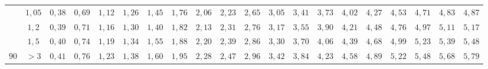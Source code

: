 \begin{table}[]
{\begin{tabular}{|c|c|c|c|c|c|c|c|c|c|c|c|c|c|c|c|c|c|c|c|}
                        & $1,05$                                                                              & \cellcolor[HTML]{FFCCC9}$0,38$ & \cellcolor[HTML]{FFCCC9}$0,69$ & \cellcolor[HTML]{FFCCC9}$1,12$ & \cellcolor[HTML]{FFCCC9}$1,26$ & \cellcolor[HTML]{FFCCC9}$1,45$ & \cellcolor[HTML]{FD6864}$1,76$ & \cellcolor[HTML]{FD6864}$2,06$ & \cellcolor[HTML]{FD6864}$2,23$ & \cellcolor[HTML]{FD6864}$2,65$ & \cellcolor[HTML]{FE0000}$3,05$ & \cellcolor[HTML]{FE0000}$3,41$ & \cellcolor[HTML]{CB0000}$3,73$ & \cellcolor[HTML]{CB0000}$4,02$                        & \cellcolor[HTML]{CB0000}$4,27$ & \cellcolor[HTML]{9A0000}$4,53$ & \cellcolor[HTML]{9A0000}$4,71$ & \cellcolor[HTML]{F8A102}$4,83$ & \cellcolor[HTML]{F8A102}$4,87$ \\ \cline{2-20} 
                        & $1,2$                                                                               & \cellcolor[HTML]{FFCCC9}$0,39$ & \cellcolor[HTML]{FFCCC9}$0,71$ & \cellcolor[HTML]{FFCCC9}$1,16$ & \cellcolor[HTML]{FFCCC9}$1,3$0 & \cellcolor[HTML]{FFCCC9}$1,40$ & \cellcolor[HTML]{FD6864}$1,82$ & \cellcolor[HTML]{FD6864}$2,13$ & \cellcolor[HTML]{FD6864}$2,31$ & \cellcolor[HTML]{FD6864}$2,76$ & \cellcolor[HTML]{FE0000}$3,17$ & \cellcolor[HTML]{FE0000}$3,55$ & \cellcolor[HTML]{CB0000}$3,90$ & \cellcolor[HTML]{CB0000}$4,21$                        & \cellcolor[HTML]{CB0000}$4,48$ & \cellcolor[HTML]{9A0000}$4,76$ & \cellcolor[HTML]{9A0000}$4,97$ & \cellcolor[HTML]{F8A102}$5,11$ & \cellcolor[HTML]{F8A102}$5,17$ \\ \cline{2-20} 
                        & $1,5$                                                                               & \cellcolor[HTML]{FFCCC9}$0,40$ & \cellcolor[HTML]{FFCCC9}$0,74$ & \cellcolor[HTML]{FFCCC9}$1,19$ & \cellcolor[HTML]{FFCCC9}$1,34$ & \cellcolor[HTML]{FFCCC9}$1,55$ & \cellcolor[HTML]{FD6864}$1,88$ & \cellcolor[HTML]{FD6864}$2,20$ & \cellcolor[HTML]{FD6864}$2,39$ & \cellcolor[HTML]{FD6864}$2,86$ & \cellcolor[HTML]{FE0000}$3,30$ & \cellcolor[HTML]{FE0000}$3,70$ & \cellcolor[HTML]{CB0000}$4,06$ & \cellcolor[HTML]{CB0000}$4,39$                        & \cellcolor[HTML]{CB0000}$4,68$ & \cellcolor[HTML]{9A0000}$4,99$ & \cellcolor[HTML]{9A0000}$5,23$ & \cellcolor[HTML]{F8A102}$5,39$ & \cellcolor[HTML]{F8A102}$5,48$ \\ \cline{2-20} 
\multirow{-5}{*}{$90$}  & $>3$                                                                                & \cellcolor[HTML]{FFCCC9}$0,41$ & \cellcolor[HTML]{FFCCC9}$0,76$ & \cellcolor[HTML]{FFCCC9}$1,23$ & \cellcolor[HTML]{FFCCC9}$1,38$ & \cellcolor[HTML]{FFCCC9}$1,60$ & \cellcolor[HTML]{FD6864}$1,95$ & \cellcolor[HTML]{FD6864}$2,28$ & \cellcolor[HTML]{FD6864}$2,47$ & \cellcolor[HTML]{FD6864}$2,96$ & \cellcolor[HTML]{FE0000}$3,42$ & \cellcolor[HTML]{FE0000}$3,84$ & \cellcolor[HTML]{CB0000}$4,23$ & \cellcolor[HTML]{CB0000}$4,58$                        & \cellcolor[HTML]{CB0000}$4,89$ & \cellcolor[HTML]{9A0000}$5,22$ & \cellcolor[HTML]{9A0000}$5,48$ & \cellcolor[HTML]{F8A102}$5,68$ & \cellcolor[HTML]{F8A102}$5,79$ \\ \hline

\end{tabular}}
\end{table}
